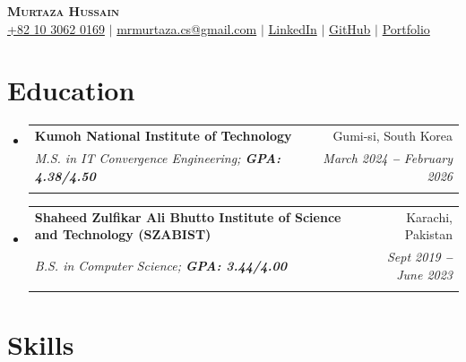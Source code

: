\documentclass[letterpaper,11pt]{article}
\makeatletter
\newcommand{\resumeEducationHeading}[6]{
  \vspace{-2pt}\item
    \begin{tabular*}{0.97\textwidth}[t]{l@{\extracolsep{\fill}}r}
      \textbf{#1} & #2 \\
      \textit{\small#3} & \textit{\small #4} \\
      \textit{\small#5} & \textit{\small #6} \\
    \end{tabular*}\vspace{-5pt}
}
\newcommand{\resumeSubHeadingListStart}{\begin{itemize}[leftmargin=0.15in, label={}]}
\newcommand{\resumeSubHeadingListEnd}{\end{itemize}}
\makeatother
\begin{document}
\begin{center}
    \textbf{\Huge \scshape Murtaza Hussain} \\ \vspace{3pt}
    \small
    \faMobile \hspace{.5pt} \href{+82 10 3062 0169}{+82 10 3062 0169}
    $|$
    \faAt \hspace{.5pt} \href{mailto:mrmurtaza.cs@gmail.com}{mrmurtaza.cs@gmail.com}
    $|$
    \faLinkedinSquare \hspace{.5pt} \href{https://www.linkedin.com/in/murtazahussain0/}{LinkedIn}
    $|$
    \faGithub \hspace{.5pt} \href{https://github.com/Murtazaabidi1}{GitHub}
    $|$
    \faGlobe \hspace{.5pt} \href{https://murtazaabidi1.github.io/}{Portfolio}
\end{center}

\section{Education}
\vspace{-2pt}
\resumeSubHeadingListStart
\resumeEducationHeading
  {Kumoh National Institute of Technology}{Gumi-si, South Korea}
  {M.S. in IT Convergence Engineering; \textbf{GPA: 4.38/4.50}}{March 2024 \textbf{--} February 2026}
  {}{}
\resumeEducationHeading
  {Shaheed Zulfikar Ali Bhutto Institute of Science and Technology (SZABIST)}{Karachi, Pakistan}
  {B.S. in Computer Science; \textbf{GPA: 3.44/4.00}}{Sept 2019 \textbf{--} June 2023}
  {}{}
\resumeSubHeadingListEnd
\section{Skills}
\vspace{-2pt}



\end{document}
